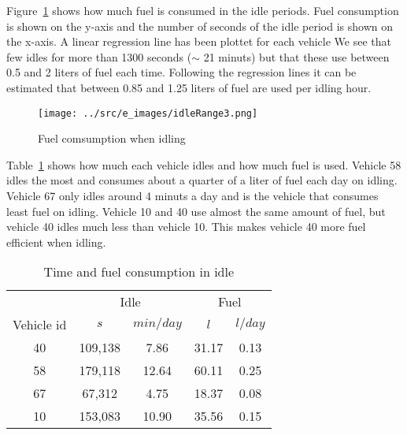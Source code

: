 Figure~\ref{fig:idleRange3} shows how much fuel is consumed in the idle periods. 
Fuel consumption is shown on the y-axis and the number of seconds of the idle period is shown on the x-axis.
A linear regression line has been plottet for each vehicle
We see that few idles for more than 1300 seconds ($\sim$ 21 minuts) but that these use between 0.5 and 2 liters of fuel each time.
Following the regression lines it can be estimated that between 0.85 and 1.25 liters of fuel are used per idling hour.  
\begin{figure}[htb]
\centering
\texttt{[image: ../src/e\_images/idleRange3.png]}
\caption{Fuel comsumption when idling}
\label{fig:idleRange3}
\end{figure}

Table~\ref{tb:idleFuel} shows how much each vehicle idles and how much fuel is used.
Vehicle 58 idles the most and consumes about a quarter of a liter of fuel each day on idling. 
Vehicle 67 only idles around 4 minuts a day and is the vehicle that consumes least fuel on idling.
Vehicle 10 and 40 use almost the same amount of fuel, but vehicle 40 idles much less than vehicle 10. 
This makes vehicle 40 more fuel efficient when idling. 
\begin{table}
\centering
\begin{tabular}{|c|c|c|c|c|}\hline%
			& \multicolumn{2}{c|}{Idle} & \multicolumn{2}{c|}{Fuel}\\
Vehicle id & $s$ & $min/day$ & $l$& $l/day$\\\hline
        40 & 109,138 & 7.86 & 31.17 & 0.13\\\hline
        58 & 179,118 & 12.64 & 60.11 & 0.25\\\hline
        67 &  67,312 & 4.75 & 18.37 & 0.08\\\hline
        10 & 153,083 & 10.90 & 35.56 & 0.15\\\hline
\end{tabular}
\caption{Time and fuel consumption in idle}\label{tb:idleFuel}
\end{table}

